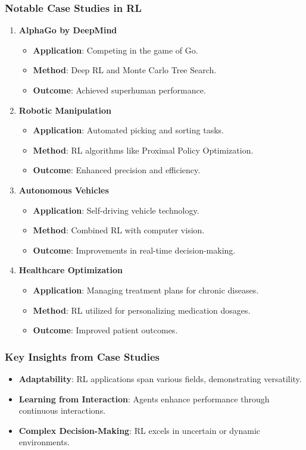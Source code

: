 \documentclass[aspectratio=169]{beamer}
\begin{document}
\begin{frame}
  \frametitle{Notable Case Studies in RL}
  \begin{enumerate}
    \item \textbf{AlphaGo by DeepMind}
    \begin{itemize}
      \item \textbf{Application}: Competing in the game of Go.
      \item \textbf{Method}: Deep RL and Monte Carlo Tree Search.
      \item \textbf{Outcome}: Achieved superhuman performance.
    \end{itemize}
    
    \item \textbf{Robotic Manipulation}
    \begin{itemize}
      \item \textbf{Application}: Automated picking and sorting tasks.
      \item \textbf{Method}: RL algorithms like Proximal Policy Optimization.
      \item \textbf{Outcome}: Enhanced precision and efficiency.
    \end{itemize}
    
    \item \textbf{Autonomous Vehicles}
    \begin{itemize}
      \item \textbf{Application}: Self-driving vehicle technology.
      \item \textbf{Method}: Combined RL with computer vision.
      \item \textbf{Outcome}: Improvements in real-time decision-making.
    \end{itemize}
    
    \item \textbf{Healthcare Optimization}
    \begin{itemize}
      \item \textbf{Application}: Managing treatment plans for chronic diseases.
      \item \textbf{Method}: RL utilized for personalizing medication dosages.
      \item \textbf{Outcome}: Improved patient outcomes.
    \end{itemize}
  \end{enumerate}
\end{frame}

\begin{frame}[fragile]
  \frametitle{Key Insights from Case Studies}
  \begin{itemize}
    \item \textbf{Adaptability}: RL applications span various fields, demonstrating versatility.
    \item \textbf{Learning from Interaction}: Agents enhance performance through continuous interactions.
    \item \textbf{Complex Decision-Making}: RL excels in uncertain or dynamic environments.
  \end{itemize}
\end{frame}
\end{document}
